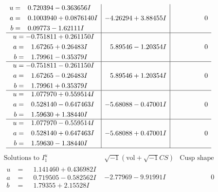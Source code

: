 \documentclass[1p]{elsarticle_modified}
\theoremstyle{definition}
\newcommand{\I}{\sqrt{-1}}
\begin{document}
$$\begin{array}{c|c|c}
\begin{aligned}
u &= \phantom{-}0.720394 - 0.363656 I \\
a &= \phantom{-}0.1003940 + 0.0876140 I \\
b &= \phantom{-}0.09773 - 1.62111 I\end{aligned}
 & -4.26294 + 3.88455 I & \phantom{-0.000000 } 0 \\ \hline\begin{aligned}
u &= -0.751811 + 0.261150 I \\
a &= \phantom{-}1.67265 + 0.26483 I \\
b &= \phantom{-}1.79961 - 0.35379 I\end{aligned}
 & \phantom{-}5.89546 - 1.20354 I & \phantom{-0.000000 } 0 \\ \hline\begin{aligned}
u &= -0.751811 - 0.261150 I \\
a &= \phantom{-}1.67265 - 0.26483 I \\
b &= \phantom{-}1.79961 + 0.35379 I\end{aligned}
 & \phantom{-}5.89546 + 1.20354 I & \phantom{-0.000000 } 0 \\ \hline\begin{aligned}
u &= \phantom{-}1.077970 + 0.559514 I \\
a &= \phantom{-}0.528140 - 0.647463 I \\
b &= \phantom{-}1.59630 + 1.38440 I\end{aligned}
 & -5.68088 - 0.47001 I & \phantom{-0.000000 } 0 \\ \hline\begin{aligned}
u &= \phantom{-}1.077970 - 0.559514 I \\
a &= \phantom{-}0.528140 + 0.647463 I \\
b &= \phantom{-}1.59630 - 1.38440 I\end{aligned}
 & -5.68088 + 0.47001 I & \phantom{-0.000000 } 0\\
 \hline 
 \end{array}$$\newpage$$\begin{array}{c|c|c}  
\text{Solutions to }I^u_{1}& \I (\text{vol} + \sqrt{-1}CS) & \text{Cusp shape}\\
 \hline 
\begin{aligned}
u &= \phantom{-}1.141460 + 0.436982 I \\
a &= \phantom{-}0.719505 - 0.582562 I \\
b &= \phantom{-}1.79355 + 2.15528 I\end{aligned}
 & -2.77969 - 9.91991 I & \phantom{-0.000000 } 0 \\ \hline\begin{aligned}

\end{aligned}
\end{array}$$
\end{document}
